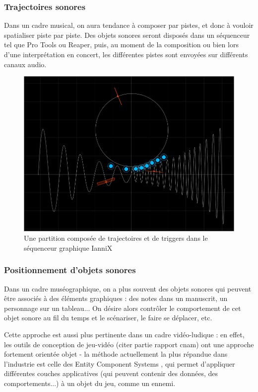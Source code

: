 \documentclass[french]{article}
\begin{document}
\subsubsection{Trajectoires sonores}
Dans un cadre musical, on aura tendance à composer par pistes, et donc à vouloir spatialiser piste par piste. Des objets sonores seront disposés dans un séquenceur tel que Pro Tools ou Reaper, puis, au moment de la composition ou bien lors d'une interprétation en concert, les différentes pistes sont envoyées sur différents canaux audio.

\begin{figure}
\centering
\includegraphics[scale=0.3]{images/iannix.png}
\caption{Une partition composée de trajectoires et de triggers dans le séquenceur graphique IanniX}
\end{figure}



\subsubsection{Positionnement d'objets sonores}
Dans un cadre muséographique, on a plus souvent des objets sonores qui peuvent être associés à des éléments graphiques : des notes dans un manuscrit, un personnage sur un tableau... On désire alors contrôler le comportement de cet objet sonore au fil du temps et le scénariser, le faire se déplacer, etc.

Cette approche est aussi plus pertinente dans un cadre vidéo-ludique : en effet, les outils de conception de jeu-vidéo (citer partie rapport cnam) ont une approche fortement orientée objet - la méthode actuellement la plus répandue dans l'industrie est celle des Entity Component Systems %
, qui permet d'appliquer différentes couches applicatives (qui peuvent contenir des données, des comportements...) à un objet du jeu, comme un ennemi.
\end{document}
